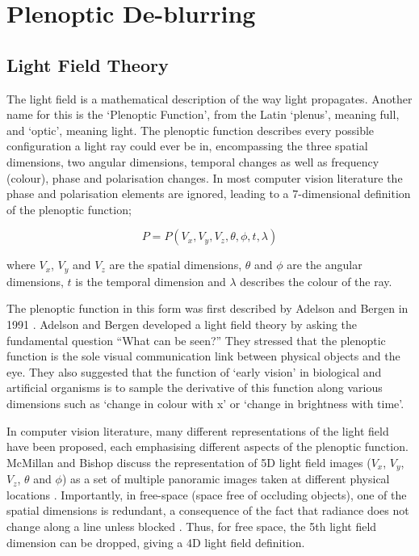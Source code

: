
\chapter{Plenoptic De-blurring}
\label{chap:plenoptic_deblurring}

\section{Light Field Theory}
\label{sec:light_field_theory}

The light field is a mathematical description of the way light propagates.
Another name for this is the \enquote*{Plenoptic Function}, from the Latin \enquote*{plenus}, meaning full, and \enquote*{optic}, meaning light.
The plenoptic function describes every possible configuration a light ray could ever be in, encompassing the three spatial dimensions, two angular dimensions, temporal changes as well as frequency (colour), phase and polarisation changes.
In most computer vision literature the phase and polarisation elements are ignored, leading to a 7-dimensional definition of the plenoptic function;

\begin{equation}
\label{eq:plenoptic_function}
P = P(V_x, V_y, V_z, \theta, \phi, t, \lambda)
\end{equation}

\noindent
where $V_x$, $V_y$ and $V_z$ are the spatial dimensions, $\theta$ and $\phi$ are the angular dimensions, $t$ is the temporal dimension and $\lambda$ describes the colour of the ray. 

The plenoptic function in this form was first described by Adelson and Bergen in 1991 \cite{adelson1991plenoptic}.
Adelson and Bergen developed a light field theory by asking the fundamental question \enquote{What can be seen?} They stressed that the plenoptic function is the sole visual communication link between physical objects and the eye.
They also suggested that the function of \enquote*{early vision} in biological and artificial organisms is to sample the derivative of this function along various dimensions such as \enquote*{change in colour with x} or \enquote*{change in brightness with time}.

In computer vision literature, many different representations of the light field have been proposed, each emphasising different aspects of the plenoptic function.
McMillan and Bishop discuss the representation of 5D light field images ($V_x$, $V_y$, $V_z$, $\theta$ and $\phi$) as a set of multiple panoramic images taken at different physical locations \cite{mcmillan1995plenoptic}.
Importantly, in free-space (space free of occluding objects), one of the spatial dimensions is redundant, a consequence of the fact that radiance does not change along a line unless blocked \cite{levoy1996light}.
Thus, for free space, the 5th light field dimension can be dropped, giving a 4D light field definition.

